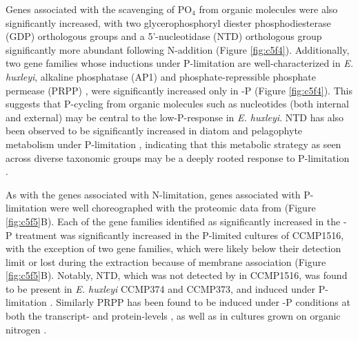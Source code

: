 Genes associated with the scavenging of PO$_4$ from organic molecules were also significantly increased, with two glycerophosphoryl diester phosphodiesterase (GDP) orthologous groups and a 5'-nucleotidase (NTD) orthologous group significantly more abundant following N-addition (Figure \ref{fig:c5f4}). Additionally, two gene families whose inductions under P-limitation are well-characterized in \textit{E. huxleyi}, alkaline phosphatase (AP1) \citep{Xu2006} and phosphate-repressible phosphate permease (PRPP) \citep{Chung2003, Dyhrman2003, Dyhrman2006}, were significantly increased only in -P (Figure \ref{fig:c5f4}). This suggests that P-cycling from organic molecules such as nucleotides (both internal and external) may be central to the low-P-response in \textit{E. huxleyi}. NTD has also been observed to be significantly increased in diatom and pelagophyte metabolism under P-limitation \citep{Wurch2011a, Dyhrman2012}, indicating that this metabolic strategy as seen across diverse taxonomic groups may be a deeply rooted response to P-limitation \citep{Martiny2013}.\par

As with the genes associated with N-limitation, genes associated with P-limitation were well choreographed with the proteomic data from \citet{McKew2015} (Figure \ref{fig:c5f5}B). Each of the gene families identified as significantly increased in the -P treatment was significantly increased in the P-limited cultures of CCMP1516, with the exception of two gene families, which were likely below their detection limit or lost during the extraction because of membrane association (Figure \ref{fig:c5f5}B). Notably, NTD, which was not detected by \citet{McKew2015} in CCMP1516, was found to be present in \textit{E. huxleyi} CCMP374 and CCMP373, and induced under P-limitation \citep{Dyhrman2003}. Similarly PRPP has been found to be induced under -P conditions at both the transcript- \citep{Dyhrman2006} and protein-levels \citep{McKew2015}, as well as in cultures grown on organic nitrogen \citep{Bruhn2010}. \par

